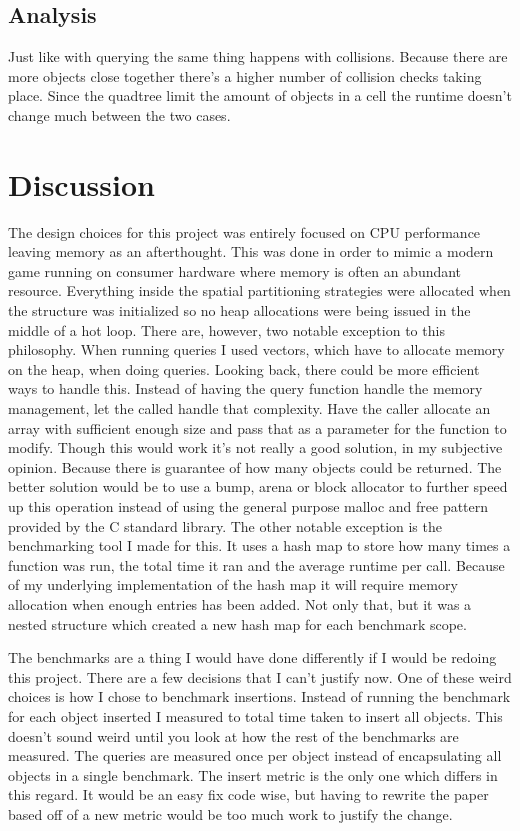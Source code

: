 \documentclass[a4paper, 12pt]{article}
\begin{document}
\subsection{Analysis}
Just like with querying the same thing happens with collisions. Because there
are more objects close together there's a higher number of collision checks
taking place. Since the quadtree limit the amount of objects in a cell the
runtime doesn't change much between the two cases.

\section{Discussion}
The design choices for this project was entirely focused on CPU performance
leaving memory as an afterthought. This was done in order to mimic a modern game
running on consumer hardware where memory is often an abundant resource.
Everything inside the spatial partitioning strategies were allocated when the
structure was initialized so no heap allocations were being issued in the middle
of a hot loop. There are, however, two notable exception to this philosophy.
When running queries I used vectors, which have to allocate memory on the heap,
when doing queries. Looking back, there could be more efficient ways to handle
this. Instead of having the query function handle the memory management, let the
called handle that complexity. Have the caller allocate an array with sufficient
enough size and pass that as a parameter for the function to modify. Though this
would work it's not really a good solution, in my subjective opinion. Because
there is guarantee of how many objects could be returned. The better solution
would be to use a bump, arena or block allocator to further speed up this
operation instead of using the general purpose malloc and free pattern provided
by the C standard library. The other notable exception is the benchmarking tool
I made for this. It uses a hash map to store how many times a function was run,
the total time it ran and the average runtime per call. Because of my underlying
implementation of the hash map it will require memory allocation when enough
entries has been added. Not only that, but it was a nested structure which
created a new hash map for each benchmark scope.

The benchmarks are a thing I would have done differently if I would be redoing
this project. There are a few decisions that I can't justify now. One of these
weird choices is how I chose to benchmark insertions. Instead of running the
benchmark for each object inserted I measured to total time taken to insert all
objects. This doesn't sound weird until you look at how the rest of the
benchmarks are measured. The queries are measured once per object instead of
encapsulating all objects in a single benchmark. The insert metric is the only
one which differs in this regard. It would be an easy fix code wise, but having
to rewrite the paper based off of a new metric would be too much work to justify
the change.
\end{document}
